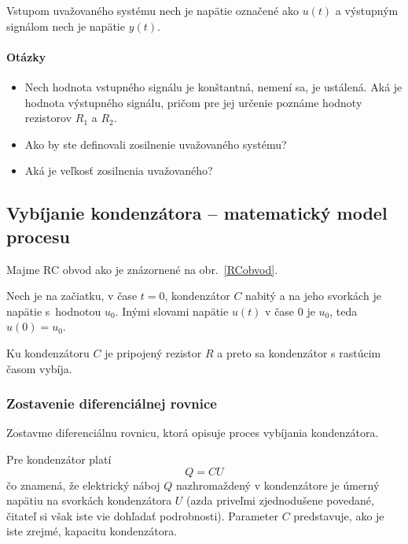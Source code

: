 \documentclass[a4paper, 10pt, ]{article}
\begin{document}
Vstupom uvažovaného systému nech je napätie označené ako $u(t)$ a výstupným signálom nech je napätie $y(t)$.


\paragraph{Otázky}
\begin{itemize}[leftmargin=0pt, labelsep=4mm, itemsep=0pt]

	\item Nech hodnota vstupného signálu je konštantná, nemení sa, je ustálená. Aká je hodnota výstupného signálu, pričom pre jej určenie poznáme hodnoty rezistorov $R_1$ a $R_2$.

    \item Ako by ste definovali zosilnenie uvažovaného systému?

    \item Aká je veľkosť zosilnenia uvažovaného?

\end{itemize}



\subsection{Vybíjanie kondenzátora -- matematický model procesu}
\label{castVybij}

Majme RC obvod ako je znázornené na obr.~\ref{RCobvod}.

\begin{center}

	\makebox[\textwidth][c]{%
	
	}

	\label{RCobvod}
\end{center}

Nech je na začiatku, v čase $t=0$, kondenzátor $C$ nabitý a na jeho svorkách je napätie s~hodnotou $u_0$. Inými slovami napätie $u(t)$ v čase $0$ je $u_0$, teda $u(0) = u_0$.

Ku kondenzátoru $C$ je pripojený rezistor $R$ a preto sa kondenzátor s rastúcim časom vybíja.


\subsubsection{Zostavenie diferenciálnej rovnice}

Zostavme diferenciálnu rovnicu, ktorá opisuje proces vybíjania kondenzátora.


Pre kondenzátor platí
\begin{equation} \label{nabojDef}
    Q = CU
\end{equation}
čo znamená, že elektrický náboj $Q$ nazhromaždený v kondenzátore je úmerný napätiu na svorkách kondenzátora $U$ (azda priveľmi zjednodušene povedané, čitateľ si však iste vie dohľadať podrobnosti). Parameter $C$ predstavuje, ako je iste zrejmé, kapacitu kondenzátora.
\end{document}
